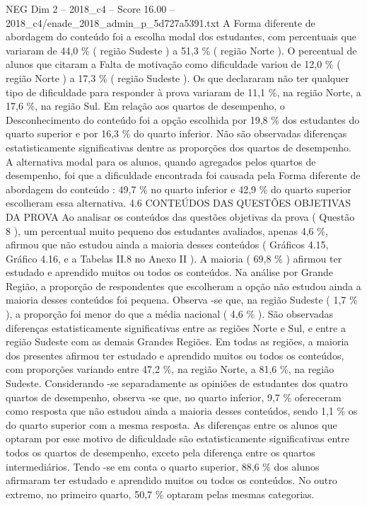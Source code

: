\begin{textsample}{NEG Dim 2 – 2018\_c4 – Score 16.00 – 2018\_c4/enade\_2018\_admin\_p\_5d727a5391.txt}
A Forma diferente de abordagem do conteúdo foi a escolha modal dos estudantes, com percentuais que variaram de 44,0 \% ( região Sudeste ) a 51,3 \% ( região Norte ).
O percentual de alunos que citaram a Falta de motivação como dificuldade variou de 12,0 \% ( região Norte ) a 17,3 \% ( região Sudeste ).
Os que declararam não ter qualquer tipo de dificuldade para responder à prova variaram de 11,1 \%, na região Norte, a 17,6 \%, na região Sul.
Em relação aos quartos de desempenho, o Desconhecimento do conteúdo foi a opção escolhida por 19,8 \% dos estudantes do quarto superior e por 16,3 \% do quarto inferior.
Não são observadas diferenças estatisticamente significativas dentre as proporções dos quartos de desempenho.
A alternativa modal para os alunos, quando agregados pelos quartos de desempenho, foi que a dificuldade encontrada foi causada pela Forma diferente de abordagem do conteúdo : 49,7 \% no quarto inferior e 42,9 \% do quarto superior escolheram essa alternativa. 4.6 CONTEÚDOS DAS QUESTÕES OBJETIVAS DA PROVA Ao analisar os conteúdos das questões objetivas da prova ( Questão 8 ), um percentual muito pequeno dos estudantes avaliados, apenas 4,6 \%, afirmou que não estudou ainda a maioria desses conteúdos ( Gráficos 4.15, Gráfico 4.16, e a Tabelas II.8 no Anexo II ).
A maioria ( 69,8 \% ) afirmou ter estudado e aprendido muitos ou todos os conteúdos.
Na análise por Grande Região, a proporção de respondentes que escolheram a opção não estudou ainda a maioria desses conteúdos foi pequena.
Observa -se que, na região Sudeste ( 1,7 \% ), a proporção foi menor do que a média nacional ( 4,6 \% ).
São observadas diferenças estatisticamente significativas entre as regiões Norte e Sul, e entre a região Sudeste com as demais Grandes Regiões.
Em todas as regiões, a maioria dos presentes afirmou ter estudado e aprendido muitos ou todos os conteúdos, com proporções variando entre 47,2 \%, na região Norte, a 81,6 \%, na região Sudeste.
Considerando -se separadamente as opiniões de estudantes dos quatro quartos de desempenho, observa -se que, no quarto inferior, 9,7 \% ofereceram como resposta que não estudou ainda a maioria desses conteúdos, sendo 1,1 \% os do quarto superior com a mesma resposta.
As diferenças entre os alunos que optaram por esse motivo de dificuldade são estatisticamente significativas entre todos os quartos de desempenho, exceto pela diferença entre os quartos intermediários.
Tendo -se em conta o quarto superior, 88,6 \% dos alunos afirmaram ter estudado e aprendido muitos ou todos os conteúdos.
No outro extremo, no primeiro quarto, 50,7 \% optaram pelas mesmas categorias.

\end{textsample}
